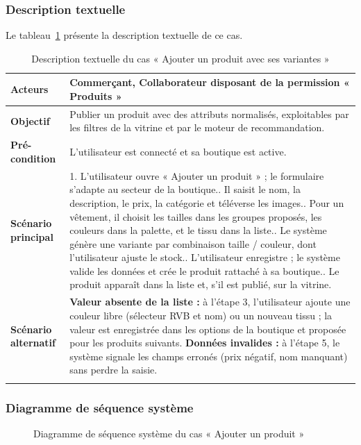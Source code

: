 \subsubsection{Description textuelle}
Le tableau~\ref{tab:uc-produit} présente la description textuelle de ce cas.
\renewcommand{\arraystretch}{1.5}
\begin{longtable}{|p{4cm}|p{11cm}|}
\hline
\textbf{Acteurs} & Commerçant, Collaborateur disposant de la permission « Produits » \\
\hline
\textbf{Objectif} & Publier un produit avec des attributs normalisés, exploitables par les filtres de la vitrine et par le moteur de recommandation. \\
\hline
\textbf{Pré-condition} & L'utilisateur est connecté et sa boutique est active. \\
\hline
\textbf{Scénario principal} &
1. L'utilisateur ouvre « Ajouter un produit » ; le formulaire s'adapte au secteur de la boutique.\newline
2. Il saisit le nom, la description, le prix, la catégorie et téléverse les images.\newline
3. Pour un vêtement, il choisit les tailles dans les groupes proposés, les couleurs dans la palette, et le tissu dans la liste.\newline
4. Le système génère une variante par combinaison taille / couleur, dont l'utilisateur ajuste le stock.\newline
5. L'utilisateur enregistre ; le système valide les données et crée le produit rattaché à sa boutique.\newline
6. Le produit apparaît dans la liste et, s'il est publié, sur la vitrine. \\
\hline
\textbf{Scénario alternatif} &
\textbf{Valeur absente de la liste :} à l'étape 3, l'utilisateur ajoute une couleur libre (sélecteur RVB et nom) ou un nouveau tissu ; la valeur est enregistrée dans les options de la boutique et proposée pour les produits suivants.\newline
\textbf{Données invalides :} à l'étape 5, le système signale les champs erronés (prix négatif, nom manquant) sans perdre la saisie. \\
\hline
\caption{Description textuelle du cas « Ajouter un produit avec ses variantes »}
\label{tab:uc-produit}
\end{longtable}

\subsubsection{Diagramme de séquence système}
\begin{figure}[H]
    \centering
    \caption{Diagramme de séquence système du cas « Ajouter un produit »}
    \label{fig:dss-produit}
\end{figure}

